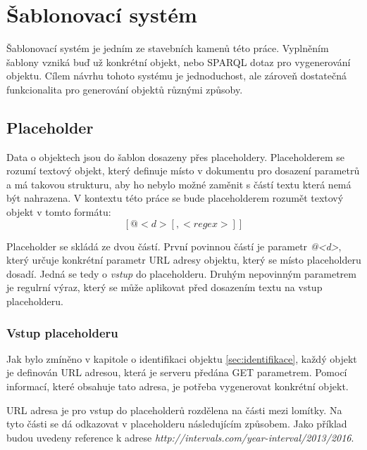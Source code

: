 \documentclass[thesis=B,czech]{FITthesis}[2012/06/26]
\begin{document}
 \section{Šablonovací systém}
 Šablonovací systém je jedním ze stavebních kamenů této práce. Vyplněním šablony vzniká buď už konkrétní objekt, nebo SPARQL dotaz pro vygenerování objektu.
 Cílem návrhu tohoto systému je jednoduchost, ale zároveň dostatečná funkcionalita pro generování objektů různými způsoby.
 
 \subsection{Placeholder}
 Data o objektech jsou do šablon dosazeny přes placeholdery. Placeholderem se rozumí textový objekt, který definuje místo v dokumentu pro dosazení parametrů
 a má takovou strukturu, aby ho nebylo možné zaměnit s částí textu která nemá být nahrazena. V kontextu této práce se bude placeholderem rozumět textový objekt
 v tomto formátu:
 \begin{equation} \label{eq:placeholder}
 [@<d>[, <regex>]]
 \end{equation}
 
 Placeholder se skládá ze dvou částí. První povinnou částí je parametr \textit{@<d>}, který určuje konkrétní parametr URL adresy objektu,
 který se místo placeholderu dosadí. Jedná se tedy o \textit{vstup} do placeholderu.
 Druhým nepovinným parametrem je regulrní výraz, který se může aplikovat před dosazením textu na vstup placeholderu.
 
 \subsubsection{Vstup placeholderu}
 Jak bylo zmíněno v kapitole o identifikaci objektu \ref{sec:identifikace}, každý objekt je definován URL adresou, která je serveru předána GET parametrem.
 Pomocí informací, které obsahuje tato adresa, je potřeba vygenerovat konkrétní objekt.
 
 URL adresa je pro vstup do placeholderů rozdělena na části mezi lomítky. Na tyto části se dá odkazovat v placeholderu následujícím způsobem. Jako příklad 
 budou uvedeny reference k adrese \textit{http://intervals.com/year-interval/2013/2016}.
  
\end{document}
